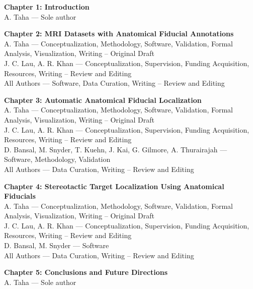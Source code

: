 
\noindent \textbf{Chapter 1: Introduction }\\
\hangindent=1.2cm A. Taha — Sole author

\vspace{0.5em}

\noindent \textbf{Chapter 2: MRI Datasets with Anatomical Fiducial Annotations}\\
\hangindent=1.2cm A. Taha — Conceptualization, Methodology, Software, Validation, Formal Analysis, Visualization, Writing – Original Draft \\
\hangindent=1.2cm J. C. Lau, A. R. Khan — Conceptualization, Supervision, Funding Acquisition, Resources, Writing – Review and Editing \\
\hangindent=1.2cm All Authors — Software, Data Curation, Writing – Review and Editing

\vspace{0.5em}

\noindent \textbf{Chapter 3: Automatic Anatomical Fiducial Localization}\\
\hangindent=1.2cm A. Taha — Conceptualization, Methodology, Software, Validation, Formal Analysis, Visualization, Writing – Original Draft \\
\hangindent=1.2cm J. C. Lau, A. R. Khan — Conceptualization, Supervision, Funding Acquisition, Resources, Writing – Review and Editing \\
\hangindent=1.2cm D. Bansal, M. Snyder, T. Kuehn, J. Kai, G. Gilmore, A. Thurairajah — Software, Methodology, Validation \\
\hangindent=1.2cm All Authors — Data Curation, Writing – Review and Editing

\vspace{0.5em}

\noindent \textbf{Chapter 4: Stereotactic Target Localization Using Anatomical Fiducials}\\
\hangindent=1.2cm A. Taha — Conceptualization, Methodology, Software, Validation, Formal Analysis, Visualization, Writing – Original Draft \\
\hangindent=1.2cm J. C. Lau, A. R. Khan — Conceptualization, Supervision, Funding Acquisition, Resources, Writing – Review and Editing \\
\hangindent=1.2cm D. Bansal, M. Snyder — Software \\
\hangindent=1.2cm All Authors — Data Curation, Writing – Review and Editing

\vspace{0.5em}

\noindent \textbf{Chapter 5: Conclusions and Future Directions}\\
\hangindent=1.2cm A. Taha — Sole author

